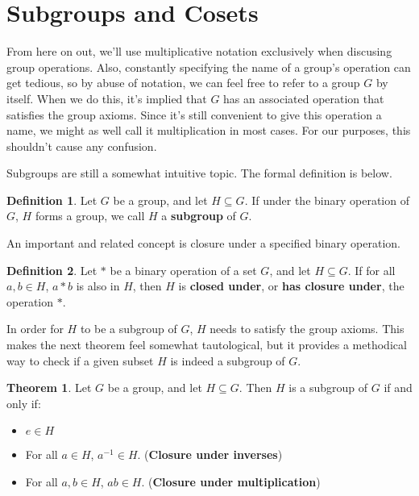 \documentclass[12pt]{article}
\newcommand{\inv}[1]{#1^{-1}}
\theoremstyle{definition}
\newtheorem{definition}{Definition}[section]
\newtheorem{theorem}{Theorem}[section]
\newenvironment{thm}
{\theoremstyle{definition}
\begin{theorem}}
{\end{theorem}}
\newenvironment{defn}[1][]
{\theoremstyle{definition}
\begin{definition}{}}
{\end{definition}}
\begin{document}
\section{Subgroups and Cosets}

From here on out, we'll use multiplicative notation exclusively when discusing group operations. Also, constantly specifying the name of a group's operation can get tedious, so by abuse of notation, we can feel free to refer to a group $G$ by itself. When we do this, it's implied that $G$ has an associated operation that satisfies the group axioms. Since it's still convenient to give this operation a name, we might as well call it multiplication in most cases. For our purposes, this shouldn't cause any confusion.

Subgroups are still a somewhat intuitive topic. The formal definition is below.

\begin{defn}
Let $G$ be a group, and let $H \subseteq G$. If under the binary operation of $G$, $H$ forms a group, we call $H$ a \textbf{subgroup} of $G$.
\end{defn}

An important and related concept is closure under a specified binary operation.

\begin{defn}
Let $*$ be a binary operation of a set $G$, and let $H \subseteq G$. If for all $a, b \in H$, $a*b$ is also in $H$, then $H$ is \textbf{closed under}, or \textbf{has closure under}, the operation $*$.
\end{defn}

In order for $H$ to be a subgroup of $G$, $H$ needs to satisfy the group axioms. This makes the next theorem feel somewhat tautological, but it provides a methodical way to check if a given subset $H$ is indeed a subgroup of $G$.

\begin{thm}
Let $G$ be a group, and let $H \subseteq G$. Then $H$ is a subgroup of $G$ if and only if:
\begin{itemize}
    \item $e \in H$
    \item For all $a \in H$, $\inv{a} \in H$. (\textbf{Closure under inverses})
    \item For all $a, b \in H$, $ab \in H$. (\textbf{Closure under multiplication})
\end{itemize}
\end{thm}
\end{document}
